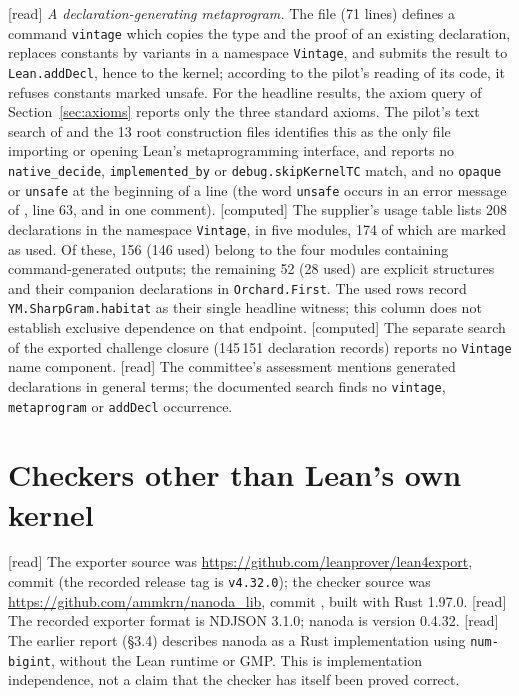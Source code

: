 \documentclass[11pt,a4paper]{article}
\theoremstyle{plain}
\theoremstyle{definition}
\theoremstyle{remark}
\numberwithin{equation}{section}
\newcommand{\st}[1]{\textsf{[#1]}}
\begin{document}
\st{read} \emph{A declaration-generating metaprogram.} The file  (71
lines) defines a command \texttt{vintage} which copies the type and the proof of an existing declaration, replaces
constants by variants in a namespace \texttt{Vintage}, and submits the result to \texttt{Lean.addDecl}, hence to
the kernel; according to the pilot's reading of its code, it refuses constants marked unsafe. For the headline results, the axiom query of Section~\ref{sec:axioms} reports only the three standard axioms. The pilot's text search of
 and the 13 root construction files identifies this as the only file importing or opening Lean's
metaprogramming interface, and reports no \texttt{native\_decide}, \texttt{implemented\_by} or \texttt{debug.skipKernelTC} match,
and no \texttt{opaque} or \texttt{unsafe} at the beginning of a line (the word \texttt{unsafe} occurs in an error message of , line 63, and in one comment).
\st{computed} The supplier's usage table lists 208 declarations in the namespace \texttt{Vintage}, in five modules,
174 of which are marked as used. Of these, 156 (146 used) belong to the four modules containing command-generated
outputs; the remaining 52 (28 used) are explicit structures and their companion declarations in \texttt{Orchard.First}.
The used rows record \texttt{YM.SharpGram.habitat} as their single headline witness; this column does not establish
exclusive dependence on that endpoint.
\st{computed} The separate search of the exported challenge closure (145\,151 declaration records) reports no
\texttt{Vintage} name component. \st{read} The committee's assessment mentions generated declarations in general terms;
the documented search finds no \texttt{vintage}, \texttt{metaprogram} or \texttt{addDecl} occurrence.

\section{Checkers other than Lean's own kernel}\label{sec:kernel}

\st{read} The exporter source was
\url{https://github.com/leanprover/lean4export}, commit
 (the recorded release tag is \texttt{v4.32.0});
the checker source was \url{https://github.com/ammkrn/nanoda_lib}, commit
, built with Rust 1.97.0.
\st{read} The recorded exporter format is NDJSON 3.1.0; nanoda is version 0.4.32.
\st{read} The earlier report (\S3.4) describes nanoda as a Rust implementation using \texttt{num-bigint},
without the Lean runtime or GMP. This is implementation independence, not a claim that the checker has itself been proved correct.
\end{document}
